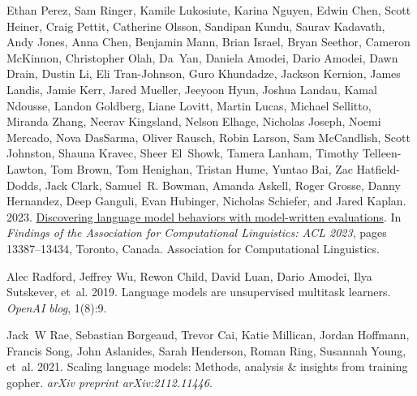 \documentclass[11pt]{article}
\begin{document}
\begin{thebibliography}{88}
    Ethan Perez, Sam Ringer, Kamile Lukosiute, Karina Nguyen, Edwin Chen, Scott Heiner, Craig Pettit, Catherine Olsson, Sandipan Kundu, Saurav Kadavath, Andy Jones, Anna Chen, Benjamin Mann, Brian Israel, Bryan Seethor, Cameron McKinnon, Christopher Olah, Da~Yan, Daniela Amodei, Dario Amodei, Dawn Drain, Dustin Li, Eli Tran-Johnson, Guro Khundadze, Jackson Kernion, James Landis, Jamie Kerr, Jared Mueller, Jeeyoon Hyun, Joshua Landau, Kamal Ndousse, Landon Goldberg, Liane Lovitt, Martin Lucas, Michael Sellitto, Miranda Zhang, Neerav Kingsland, Nelson Elhage, Nicholas Joseph, Noemi Mercado, Nova DasSarma, Oliver Rausch, Robin Larson, Sam McCandlish, Scott Johnston, Shauna Kravec, Sheer El~Showk, Tamera Lanham, Timothy Telleen-Lawton, Tom Brown, Tom Henighan, Tristan Hume, Yuntao Bai, Zac Hatfield-Dodds, Jack Clark, Samuel~R. Bowman, Amanda Askell, Roger Grosse, Danny Hernandez, Deep Ganguli, Evan Hubinger, Nicholas Schiefer, and Jared Kaplan. 2023.
    \newblock \href {https://doi.org/10.18653/v1/2023.findings-acl.847} {Discovering language model behaviors with model-written evaluations}.
    \newblock In \emph{Findings of the Association for Computational Linguistics: ACL 2023}, pages 13387--13434, Toronto, Canada. Association for Computational Linguistics.
    
    Alec Radford, Jeffrey Wu, Rewon Child, David Luan, Dario Amodei, Ilya Sutskever, et~al. 2019.
    \newblock Language models are unsupervised multitask learners.
    \newblock \emph{OpenAI blog}, 1(8):9.
    
    Jack~W Rae, Sebastian Borgeaud, Trevor Cai, Katie Millican, Jordan Hoffmann, Francis Song, John Aslanides, Sarah Henderson, Roman Ring, Susannah Young, et~al. 2021.
    \newblock Scaling language models: Methods, analysis \& insights from training gopher.
    \newblock \emph{arXiv preprint arXiv:2112.11446}.
    

\end{thebibliography}
\end{document}

